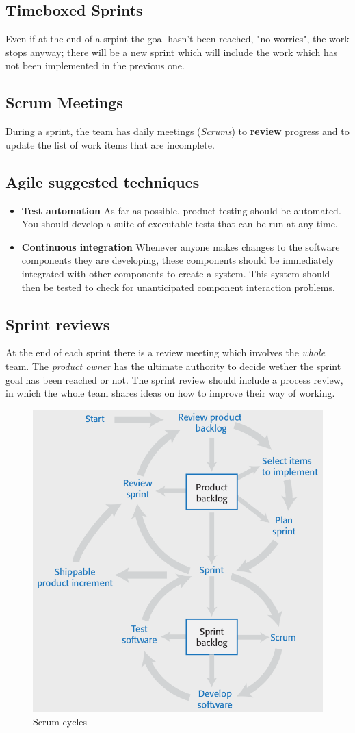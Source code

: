 \subsection{Timeboxed Sprints}
Even if at the end of a srpint the goal hasn't been reached, "no worries", the work stops anyway;
there will be a new sprint which will include the work which has not been implemented in the previous one.

\subsection{Scrum Meetings}
During a sprint, the team has daily meetings (\textit{Scrums}) to \textbf{review} progress
and to update the list of work items that are incomplete.

\subsection{Agile suggested techniques}
\begin{itemize}
    \item \textbf{Test automation}
    As far as possible, product testing should be automated. You should
    develop a suite of executable tests that can be run at any time.
    \item \textbf{Continuous integration}
    Whenever anyone makes changes to the software components they are
    developing, these components should be immediately integrated with
    other components to create a system. This system should then be tested
    to check for unanticipated component interaction problems.
\end{itemize}

\subsection{Sprint reviews}
At the end of each sprint there is a review meeting which involves the \textit{whole} team.
The \textit{product owner} has the ultimate authority to decide wether the sprint goal has been reached or not.
The sprint review should include a process review, in which the whole team shares ideas on how to improve their way of working.

\begin{figure}[htbp]
    \centering
    \includegraphics[width=0.45\columnwidth]{images/scrum_cycles.png}
    \caption{Scrum cycles}
    \label{fig:scrum_cycles}
\end{figure}

